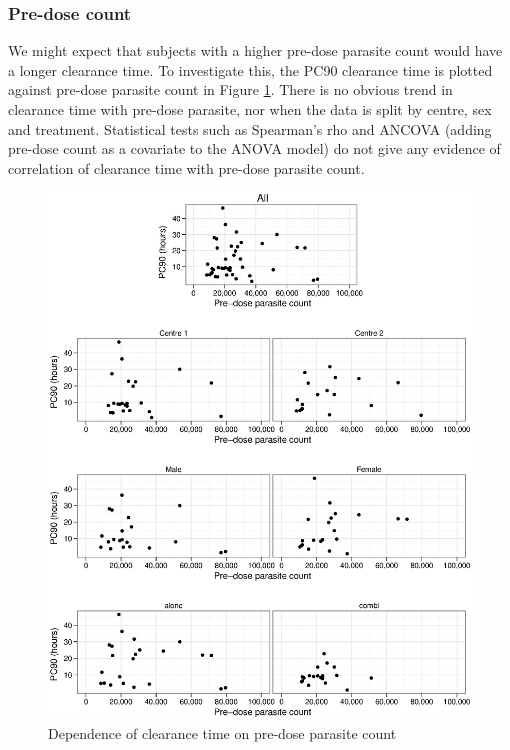 \subsubsection*{Pre-dose count}\label{sec:predoseancova}
We might expect that subjects with a higher pre-dose parasite count would have a longer clearance time. To investigate this, the PC90 clearance time is plotted against pre-dose parasite count in Figure \ref{predose-ancova}. There is no obvious trend in clearance time with pre-dose parasite, nor when the data is split by centre, sex and treatment. Statistical tests such as Spearman's rho and ANCOVA (adding pre-dose count as a covariate to the ANOVA model) do not give any evidence of correlation of clearance time with pre-dose parasite count.
\begin{figure}[p]
\includegraphics[width=150mm]{predose-ancova.eps} 
\caption{Dependence of clearance time on pre-dose parasite count}
\label{predose-ancova}
\end{figure}


